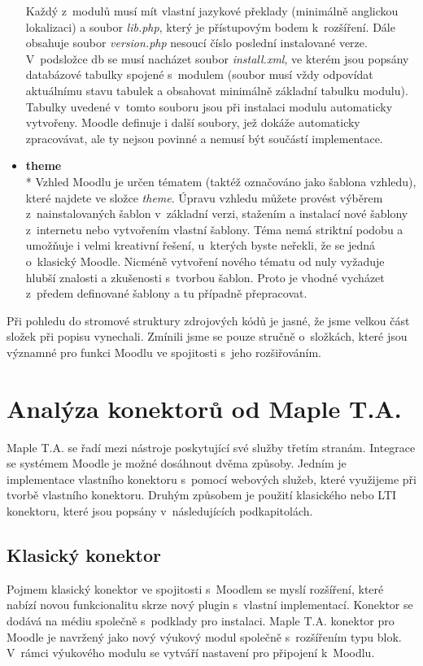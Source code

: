 \documentclass[
print,
  11pt,
  table,   
  nolof,    
  nolot,
  oneside,
  draft
]{fithesis3}
\begin{document}
\begin{itemize}
Každý z~modulů musí mít vlastní jazykové překlady (minimálně anglickou lokalizaci) a soubor \emph{lib.php}, který je přístupovým bodem k~rozšíření. Dále obsahuje soubor \emph{version.php} nesoucí číslo poslední instalované verze. V~podsložce db se musí nacházet soubor \emph{install.xml}, ve kterém jsou popsány databázové tabulky spojené s~modulem (soubor musí vždy odpovídat aktuálnímu stavu tabulek a obsahovat minimálně základní tabulku modulu). Tabulky uvedené v~tomto souboru jsou při instalaci modulu automaticky vytvořeny. Moodle definuje i další soubory, jež dokáže automaticky zpracovávat, ale ty nejsou povinné a nemusí být součástí implementace.

\item \textbf{theme} \\*
Vzhled Moodlu je určen tématem (taktéž označováno jako šablona vzhledu), které najdete ve složce \emph{theme}. Úpravu vzhledu můžete provést výběrem z~nainstalovaných šablon v~základní verzi, stažením a instalací nové šablony z~internetu nebo vytvořením vlastní šablony. Téma nemá striktní podobu a umožňuje i velmi kreativní řešení, u~kterých byste neřekli, že se jedná o~klasický Moodle. Nicméně vytvoření nového tématu od nuly vyžaduje hlubší znalosti a zkušenosti s~tvorbou šablon. Proto je vhodné vycházet z~předem definované šablony a tu případně přepracovat. 
\end{itemize}
Při pohledu do stromové struktury zdrojových kódů je jasné, že jsme velkou část složek při popisu vynechali. Zmínili jsme se pouze stručně o~složkách, které jsou významné pro funkci Moodlu ve spojitosti s~jeho rozšiřováním.

	\section{Analýza konektorů od Maple T.A.}
Maple T.A. se řadí mezi nástroje poskytující své služby třetím stranám. Integrace se systémem Moodle je možné dosáhnout dvěma způsoby. Jedním je implementace vlastního konektoru s~pomocí webových služeb, které využijeme při tvorbě vlastního konektoru. Druhým způsobem je použití klasického nebo LTI konektoru, které jsou popsány v~následujících podkapitolách. 
		\subsection{Klasický konektor}
Pojmem klasický konektor ve spojitosti s~Moodlem se myslí rozšíření, které nabízí novou funkcionalitu skrze nový plugin s~vlastní implementací. Konektor se dodává na médiu společně s~podklady pro instalaci. Maple T.A. konektor pro Moodle je navržený jako nový výukový modul společně s~rozšířením typu blok. V~rámci výukového modulu se vytváří nastavení pro připojení k~Moodlu. 
\end{document}
